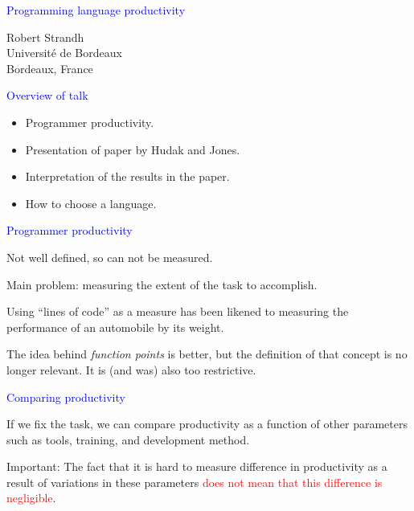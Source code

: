 \documentclass{slides}
\newcommand{\red}[1]{\textcolor{red}{#1}}
\newcommand{\ti}[1]{\begin{center}\Large{\textcolor{blue}{#1}}\end{center}}
\begin{document}
\landscape
\setlength{\oddsidemargin}{1cm}
\setlength{\evensidemargin}{1cm}
\setlength{\marginparwidth}{1cm}
\setlength{\parskip}{0.5cm}
\setlength{\parindent}{0cm}
\begin{slide}\ti{Programming language productivity}
\vskip 0.5cm
\begin{center}
Robert Strandh \\
Université de Bordeaux \\
Bordeaux, France
\end{center}
\vfill\end{slide}
\begin{slide}\ti{Overview of talk}

  \begin{itemize}
  \item Programmer productivity.
  \item Presentation of paper by Hudak and Jones.
  \item Interpretation of the results in the paper.
  \item How to choose a language.
  \end{itemize}

\vfill\end{slide}
\begin{slide}\ti{Programmer productivity}

Not well defined, so can not be measured.

Main problem: measuring the extent of the task to accomplish.

Using ``lines of code'' as a measure has been likened to measuring the
performance of an automobile by its weight.

The idea behind \emph{function points} is better, but the definition
of that concept is no longer relevant.  It is (and was) also too
restrictive.

\vfill\end{slide}
\begin{slide}\ti{Comparing productivity}

If we fix the task, we can compare productivity as a function of other
parameters such as tools, training, and development method.

Important: The fact that it is hard to measure difference in
productivity as a result of variations in these parameters \red{does
  not mean that this difference is negligible}.

\vfill\end{slide}
\end{document}
